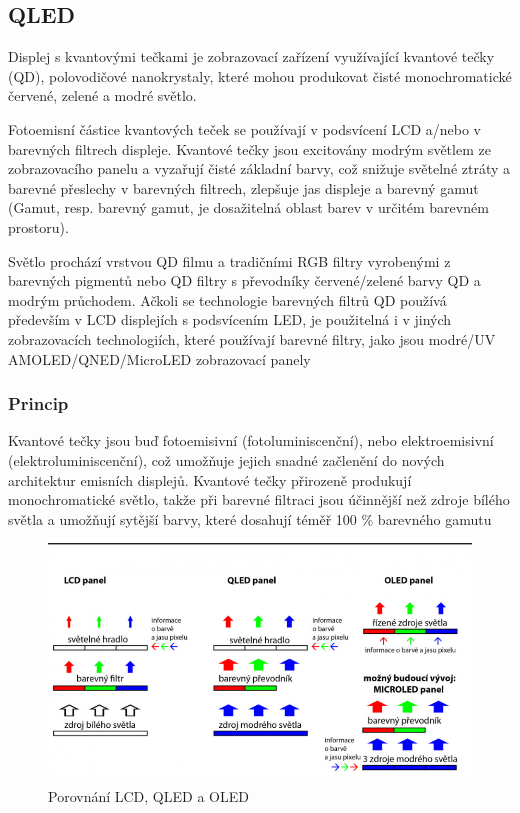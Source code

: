 \subsection{QLED}
Displej s kvantovými tečkami je zobrazovací zařízení využívající kvantové tečky (QD), polovodičové nanokrystaly, které mohou produkovat čisté monochromatické červené, zelené a modré světlo.

Fotoemisní částice kvantových teček se používají v podsvícení LCD a/nebo v barevných filtrech displeje. Kvantové tečky jsou excitovány modrým světlem ze zobrazovacího panelu a vyzařují čisté základní barvy, což snižuje světelné ztráty a barevné přeslechy v barevných filtrech, zlepšuje jas displeje a barevný gamut (Gamut, resp. barevný gamut, je dosažitelná oblast barev v určitém barevném prostoru). 

Světlo prochází vrstvou QD filmu a tradičními RGB filtry vyrobenými z barevných pigmentů nebo QD filtry s převodníky červené/zelené barvy QD a modrým průchodem. Ačkoli se technologie barevných filtrů QD používá především v LCD displejích s podsvícením LED, je použitelná i v jiných zobrazovacích technologiích, které používají barevné filtry, jako jsou modré/UV AMOLED/QNED/MicroLED zobrazovací panely
\subsubsection{Princip}
Kvantové tečky jsou buď fotoemisivní (fotoluminiscenční), nebo elektroemisivní (elektroluminiscenční), což umožňuje jejich snadné začlenění do nových architektur emisních displejů. Kvantové tečky přirozeně produkují monochromatické světlo, takže při barevné filtraci jsou účinnější než zdroje bílého světla a umožňují sytější barvy, které dosahují téměř 100 \% barevného gamutu
    \begin{figure}[h]
   \begin{center}
     \includegraphics[scale=0.6]{images/QLED.png}
   \end{center}
   \caption{Porovnání LCD, QLED a OLED}
  \end{figure}















